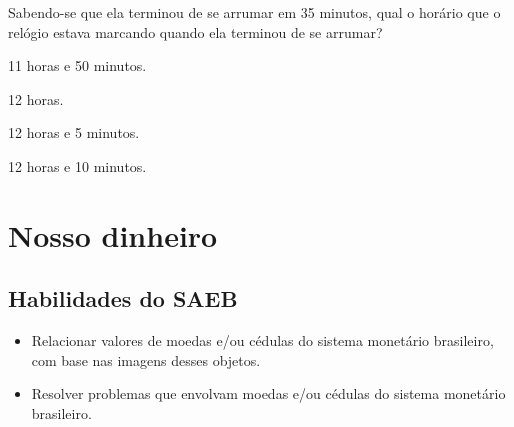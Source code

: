 Sabendo-se que ela terminou de se arrumar em 35 minutos, qual o horário
que o relógio estava marcando quando ela terminou de se arrumar?

\begin{minipage}{.5\textwidth}
\begin{escolha}
\item
  11 horas e 50 minutos.
\item
  12 horas.
\item
  12 horas e 5 minutos.
\item
  12 horas e 10 minutos.
\end{escolha}
\end{minipage}


\chapter{Nosso dinheiro}

\section*{Habilidades do SAEB}

\begin{itemize}
\item Relacionar valores de moedas e/ou cédulas do sistema monetário
brasileiro, com base nas imagens desses objetos.

\item Resolver problemas que envolvam moedas e/ou cédulas do sistema
monetário brasileiro.
\end{itemize}

